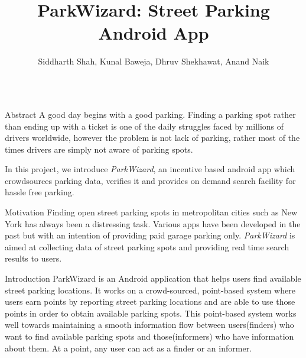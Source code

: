 \documentclass[final]{beamer}
\title{ParkWizard: Street Parking Android App} %
\author{Siddharth Shah, Kunal Baweja, Dhruv Shekhawat, Anand Naik} %
\newlength{\onecolwid}
\begin{document}


\begin{frame}[t] %

\begin{columns}[t] %

\begin{column}{\onecolwid} %

\begin{alertblock}{Abstract}
A good day begins with a good parking. Finding a parking spot rather than ending up with a ticket is one of the daily struggles faced by millions of drivers worldwide, however the problem is not lack of parking, rather most of the times drivers are simply not aware of parking spots.\par
In this project, we introduce \textit{ParkWizard}, an incentive based android app which crowdsources parking data, verifies it and provides on demand search
facility for hassle free parking.
\end{alertblock}

\begin{block}{Motivation}
Finding open street parking spots in metropolitan cities such as New York has always been a distressing task. Various apps have been developed in the past but with an intention of providing paid garage parking only. \textit{ParkWizard} is aimed at collecting data of street parking spots and providing real time search results to users.
\end{block}


\begin{block}{Introduction}
ParkWizard is an Android application that helps users find available street parking locations. It works on a crowd-sourced, point-based system where users earn points by reporting street parking locations and are able to use those points in order to obtain available parking spots. This point-based system works well towards maintaining a smooth information flow between users(finders) who want to find available parking spots and those(informers) who have information about them. At a point, any user can act as a finder or an informer.\par


\end{block}
\end{column}
\end{columns}
\end{frame}
\end{document}
